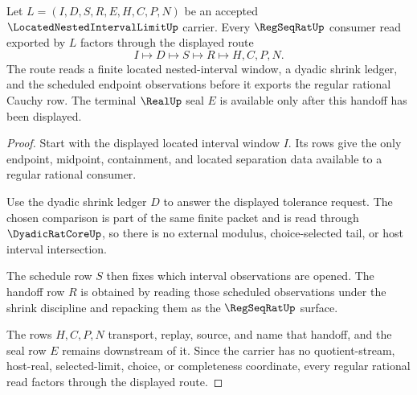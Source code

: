 \begin{theorem}
\label{thm:located-nested-interval-limit-regseqrat-handoff}
Let $L=(I,D,S,R,E,H,C,P,N)$ be an accepted $\LocatedNestedIntervalLimitUp$ carrier. Every $\RegSeqRatUp$ consumer read exported by $L$ factors through the displayed route
$$
I\longmapsto D\longmapsto S\longmapsto R\longmapsto H,C,P,N .
$$
The route reads a finite located nested-interval window, a dyadic shrink ledger, and the scheduled endpoint observations before it exports the regular rational Cauchy row. The terminal $\RealUp$ seal $E$ is available only after this handoff has been displayed.
\end{theorem}
\begin{proof}
Start with the displayed located interval window $I$. Its rows give the only endpoint, midpoint, containment, and located separation data available to a regular rational consumer.

Use the dyadic shrink ledger $D$ to answer the displayed tolerance request. The chosen comparison is part of the same finite packet and is read through $\DyadicRatCoreUp$, so there is no external modulus, choice-selected tail, or host interval intersection.

The schedule row $S$ then fixes which interval observations are opened. The handoff row $R$ is obtained by reading those scheduled observations under the shrink discipline and repacking them as the $\RegSeqRatUp$ surface.

The rows $H,C,P,N$ transport, replay, source, and name that handoff, and the seal row $E$ remains downstream of it. Since the carrier has no quotient-stream, host-real, selected-limit, choice, or completeness coordinate, every regular rational read factors through the displayed route.
\end{proof}


